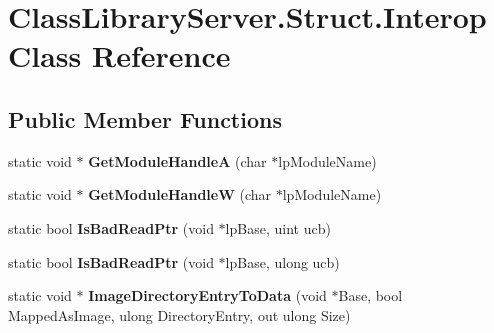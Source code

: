 \hypertarget{class_class_library_server_1_1_struct_1_1_interop}{}\section{Class\+Library\+Server.\+Struct.\+Interop Class Reference}
\label{class_class_library_server_1_1_struct_1_1_interop}
\subsection*{Public Member Functions}
\begin{DoxyCompactItemize}
\item 
\mbox{\label{class_class_library_server_1_1_struct_1_1_interop_a2af7410b79f5980781f65eb4da38af6a}} 
static void $\ast$ {\bfseries Get\+Module\+HandleA} (char $\ast$lp\+Module\+Name)
\item 
\mbox{\label{class_class_library_server_1_1_struct_1_1_interop_ab10dc5648efa72db11e600a95f20d037}} 
static void $\ast$ {\bfseries Get\+Module\+HandleW} (char $\ast$lp\+Module\+Name)
\item 
\mbox{\label{class_class_library_server_1_1_struct_1_1_interop_a9b4a9685f435e57614a954f94e4115c7}} 
static bool {\bfseries Is\+Bad\+Read\+Ptr} (void $\ast$lp\+Base, uint ucb)
\item 
\mbox{\label{class_class_library_server_1_1_struct_1_1_interop_a07996454d1197adf9537011fc5cece7a}} 
static bool {\bfseries Is\+Bad\+Read\+Ptr} (void $\ast$lp\+Base, ulong ucb)
\item 
\mbox{\label{class_class_library_server_1_1_struct_1_1_interop_a466d767c6d61625fc261d6a06208e303}} 
static void $\ast$ {\bfseries Image\+Directory\+Entry\+To\+Data} (void $\ast$Base, bool Mapped\+As\+Image, ulong Directory\+Entry, out ulong Size)
\item 
\mbox{\label{class_class_library_server_1_1_struct_1_1_interop_a1e66c1942db3ffcf045abad0a9118336}} 

\end{DoxyCompactItemize}
